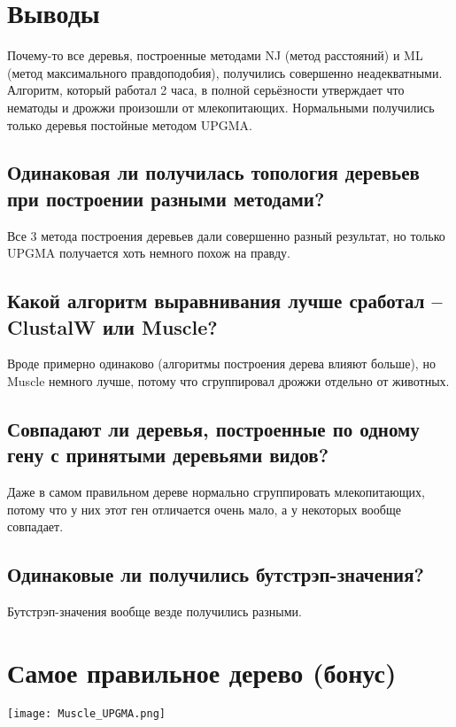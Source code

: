 \documentclass{article}
\begin{document}
  \section{Выводы}
  Почему-то все деревья, построенные методами NJ (метод расстояний) и ML (метод максимального правдоподобия),
  получились совершенно неадекватными.
  Алгоритм, который работал 2 часа, в полной серьёзности утверждает что нематоды и дрожжи произошли от млекопитающих.
  Нормальными получились только деревья постойные методом UPGMA.

  \subsection{Одинаковая ли получилась топология деревьев при построении разными методами?}
  Все 3 метода построения деревьев дали совершенно разный результат, но только UPGMA получается хоть немного похож на правду.

  \subsection{Какой алгоритм выравнивания лучше сработал -- ClustalW или Muscle?}
  Вроде примерно одинаково (алгоритмы построения дерева влияют больше),
  но Muscle немного лучше, потому что сгруппировал дрожжи отдельно от животных.

  \subsection{Совпадают ли деревья, построенные по одному гену с принятыми деревьями видов?}
  Даже в самом правильном дереве нормально сгруппировать млекопитающих,
  потому что у них этот ген отличается очень мало, а у некоторых вообще совпадает.

  \subsection{Одинаковые ли получились бутстрэп-значения?}
  Бутстрэп-значения вообще везде получились разными.

  \section{Самое правильное дерево (бонус)}
  \texttt{[image: Muscle\_UPGMA.png]}
\end{document}
